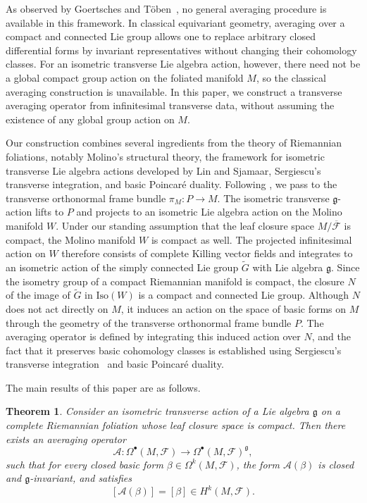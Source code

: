\documentclass[reqno, 11pt]{amsart}
\newtheorem{thm}{Theorem}[section]
\theoremstyle{definition}
\theoremstyle{property}
\theoremstyle{remark}
\numberwithin{equation}{section}
\begin{document}
As observed by Goertsches and T\"oben~\cite[Sec.~3.6]{GT10}, 
no general averaging procedure is available in this framework.
In classical equivariant
geometry, averaging over a compact and connected Lie group allows one to
replace arbitrary closed differential forms by invariant representatives
without changing their cohomology classes. For an isometric transverse Lie
algebra action, however, there need not be a global compact group action on
the foliated manifold $M$, so the classical averaging construction is
unavailable. In this paper, we construct a transverse averaging operator from
infinitesimal transverse data, without assuming the existence of any global
group action on $M$.

Our construction combines several ingredients from the theory of Riemannian
foliations, notably Molino's structural theory, the framework for isometric
transverse Lie algebra actions developed by Lin and Sjamaar, Sergiescu's
transverse integration, and basic Poincar\'e duality. Following \cite{LS20},
we pass to the transverse orthonormal frame bundle $\pi_M:P\to M$. The
isometric transverse $\mathfrak g$-action lifts to $P$ and projects to an
isometric Lie algebra action on the Molino manifold $W$. Under our standing
assumption that the leaf closure space $M/\overline{\mathcal F}$ is compact,
the Molino manifold $W$ is compact as well. The projected infinitesimal
action on $W$ therefore consists of complete Killing vector fields and
integrates to an isometric action of the simply connected Lie group
$\widetilde G$ with Lie algebra $\mathfrak g$. Since the isometry group of a
compact Riemannian manifold is compact, the closure $N$ of the image of
$\widetilde G$ in $\mathrm{Iso}(W)$ is a compact and connected Lie group.
Although $N$ does not act directly on $M$, it induces an action on the space
of basic forms on $M$ through the geometry of the transverse orthonormal
frame bundle $P$. The averaging operator is defined by integrating this
induced action over $N$, and the fact that it preserves basic cohomology
classes is established using Sergiescu's transverse integration~\cite{Ser85}
and basic Poincar\'e duality.

The main results of this paper are as follows.

\begin{thm}\label{average-operator}
Consider an isometric transverse action of a Lie algebra $\mathfrak{g}$ on a
complete Riemannian foliation whose leaf closure space is compact. Then there exists
an averaging operator
\[
\mathcal{A}: \Omega^\bullet(M, \mathcal{F}) \to \Omega^\bullet(M, \mathcal{F})^{\mathfrak{g}},
\]
such that for every closed basic form $\beta \in \Omega^k(M,\mathcal{F})$,
the form $\mathcal{A}(\beta)$ is closed and $\mathfrak{g}$-invariant, and
satisfies
\[
[\mathcal{A}(\beta)] = [\beta] \in H^k(M,\mathcal{F}).
\]
\end{thm}
\end{document}
